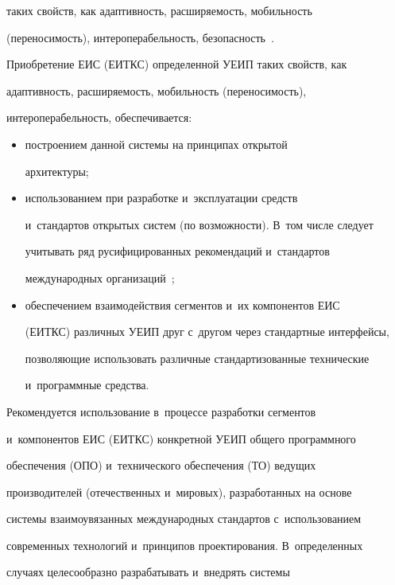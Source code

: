 таких свойств, как адап\-тив\-ность, расширяемость, мобильность 

(переносимость), интероперабельность, безопасность~\cite{10-zk, 11-zk}.

     

     Приобретение ЕИС (ЕИТКС) определенной УЕИП таких свойств, как 

адап\-тив\-ность, расширяемость, мобильность (переносимость), 

интероперабельность, обеспечивается:

     \begin{itemize}

     \item  построением данной системы на принципах открытой 

архитектуры;

     \item использованием при разработке и~эксплуатации средств 

     и~стандартов открытых систем (по возможности). В~том числе следует 

учитывать ряд русифицированных рекомендаций и~стандартов 

международных организаций~\cite{10-zk, 9-zk, 8-zk};

     \item обеспечением взаимодействия сегментов и~их компонентов ЕИС 

(ЕИТКС) различных УЕИП друг с~другом через стандартные интерфейсы, 

поз\-во\-ля\-ющие использовать различные стандартизованные технические 

и~про\-грам\-мные средства. 

     \end{itemize}

     

     Рекомендуется использование в~процессе разработки сегментов 

     и~компонентов ЕИС (ЕИТКС) конкретной УЕИП общего программного 

обеспечения (ОПО) и~технического обеспечения (ТО) ведущих 

производителей (отечественных и~мировых), разработанных на основе 

системы взаимоувязанных международных стандартов с~использованием 

современных технологий и~принципов проектирования. В~определенных 

случаях целесообразно разрабатывать и~внедрять системы 

